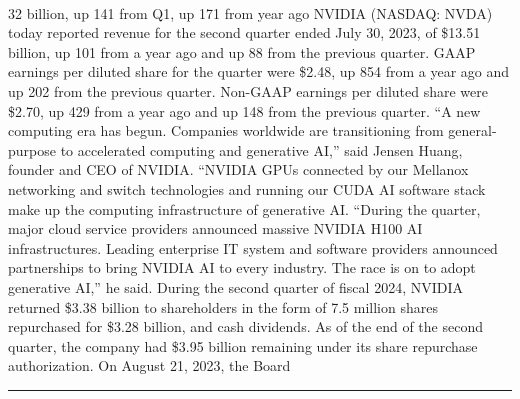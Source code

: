 \documentclass[10pt,a4paper]{article}
\begin{document}
\begin{multicols*}{2}
\paragraph{}
32 billion, up 141 from Q1, up 171 from year ago
NVIDIA (NASDAQ: NVDA) today reported revenue for the second quarter ended July 30, 2023, of \$13.51 billion, up 101 from a year ago and up 88 from the previous quarter.
GAAP earnings per diluted share for the quarter were \$2.48, up 854 from a year ago and up 202 from the previous quarter. Non-GAAP earnings per diluted share were \$2.70, up 429 from a year ago and up 148 from the previous quarter.
“A new computing era has begun. Companies worldwide are transitioning from general-purpose to accelerated computing and generative AI,” said Jensen Huang, founder and CEO of NVIDIA.
“NVIDIA GPUs connected by our Mellanox networking and switch technologies and running our CUDA AI software stack make up the computing infrastructure of generative AI.
“During the quarter, major cloud service providers announced massive NVIDIA H100 AI infrastructures. Leading enterprise IT system and software providers announced partnerships to bring NVIDIA AI to every industry. The race is on to adopt generative AI,” he said.
During the second quarter of fiscal 2024, NVIDIA returned \$3.38 billion to shareholders in the form of 7.5 million shares repurchased for \$3.28 billion, and cash dividends. As of the end of the second quarter, the company had \$3.95 billion remaining under its share repurchase authorization. On August 21, 2023, the Board 
\par\noindent\textcolor{red}{\rule{\linewidth}{0.2mm}}
\vfill
\null
\noindent\begin{minipage}{\linewidth}

\end{minipage}
\end{multicols*}
\end{document}
